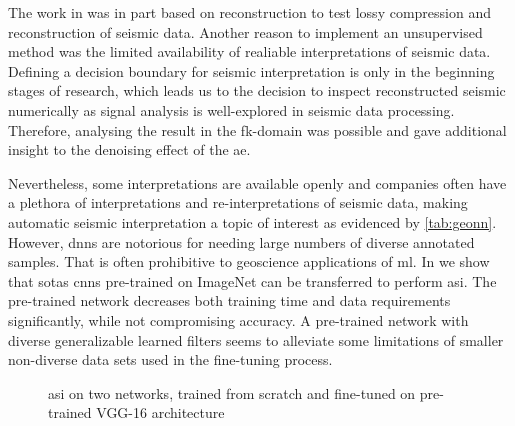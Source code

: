 The work in  was in part based on reconstruction to test lossy compression and reconstruction of seismic data. Another reason to implement an unsupervised method was the limited availability of realiable interpretations of seismic data. Defining a decision boundary for seismic interpretation is only in the beginning stages of research, which leads us to the decision to inspect reconstructed seismic numerically as signal analysis is well-explored in seismic data processing. Therefore, analysing the result in the \ac{fk}-domain was possible and gave additional insight to the denoising effect of the \ac{ae}.

Nevertheless, some interpretations are available openly and companies often have a plethora of interpretations and re-interpretations of seismic data, making automatic seismic interpretation a topic of interest as evidenced by \cref{tab:geonn}. However, \aclp{dnn} are notorious for needing large numbers of diverse annotated samples. That is often prohibitive to geoscience applications of \acl{ml}. In  we show that \aclp{sota} \aclp{cnn} pre-trained on ImageNet can be transferred to perform \acl{asi}. The pre-trained network decreases both training time and data requirements significantly, while not compromising accuracy. A pre-trained network with diverse generalizable learned filters seems to alleviate some limitations of smaller non-diverse data sets used in the fine-tuning process.

\begin{figure}[!ht]
\caption{\acl{asi} on two networks, trained from scratch and fine-tuned on pre-trained VGG-16 architecture \citep[from][]{dramsch2018deep}}
\label{fig:asi}
\end{figure}

